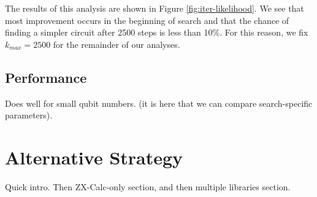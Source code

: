 The results of this analysis are shown in Figure \ref{fig:iter-likelihood}.
We see that most improvement occurs in the beginning of search and that the chance of finding a simpler circuit after 2500 steps is less than 10\%.
For this reason, we fix $k_{max} = 2500$ for the remainder of our analyses.


\subsection{Performance}



Does well for small qubit numbers. (it is here that we can compare search-specific parameters).

\section{Alternative Strategy}

Quick intro. Then ZX-Calc-only section, and then multiple libraries section.
